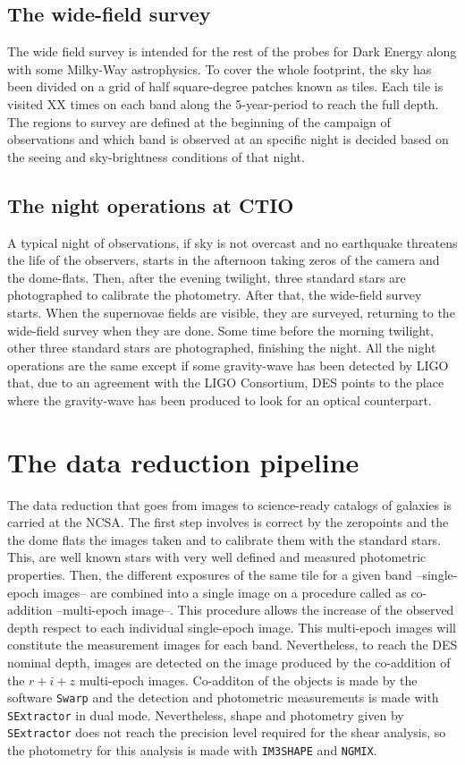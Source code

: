 \subsection{The wide-field survey}
The wide field survey is intended for the rest of the probes for Dark Energy along with some Milky-Way astrophysics. To cover the whole footprint, the sky has been divided on a grid of half square-degree patches known as tiles. Each tile is visited XX times on each band along the 5-year-period to reach the full depth. The regions to survey are defined at the beginning of the campaign of observations and which band is observed at an specific night is decided based on the seeing and sky-brightness conditions of that night.

\subsection{The night operations at CTIO}
A typical night of observations, if sky is not overcast and no earthquake threatens the life of the observers, starts in the afternoon taking zeros of the camera and the dome-flats. Then, after the evening twilight, three standard stars are photographed to calibrate the photometry. After that, the wide-field survey starts. When the supernovae fields are visible, they are surveyed, returning to the wide-field survey when they are done. Some time before the morning twilight, other three standard stars are photographed, finishing the night. All the night operations are the same except if some gravity-wave has been detected by LIGO that, due to an agreement with the LIGO Consortium,  DES points to the place where the gravity-wave has been produced to look for an optical counterpart.

\section{The data reduction pipeline}
The data reduction that goes from images to science-ready catalogs of galaxies is carried at the NCSA. The first step involves is correct by the zeropoints and the the dome flats the images taken and to calibrate them with the standard stars. This, are well known stars with very well defined and measured photometric properties. Then, the different exposures of the same tile for a given band --single-epoch images-- are combined into a single image on a procedure called as co-addition --multi-epoch image--. This procedure allows the increase of the observed depth respect to each individual single-epoch image. This multi-epoch images will constitute the measurement images for each band. Nevertheless, to reach the DES nominal depth, images are detected on the image produced by the co-addition of the $r+i+z$ multi-epoch images. Co-additon of the objects is made by the software {\tt Swarp} and the detection and photometric measurements is made with {\tt SExtractor} in dual mode. Nevertheless, shape and photometry given by {\tt SExtractor} does not reach the precision level required for the shear analysis, so the photometry for this analysis is made with {\tt IM3SHAPE} and {\tt NGMIX}.

